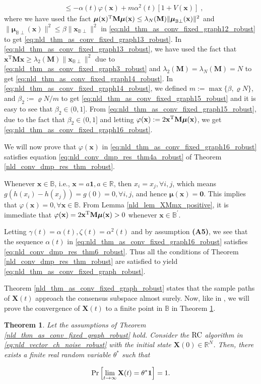 \documentclass[onecolumn, draft, 12pt]{IEEEtran}
\newcommand{\vrho}{\ensuremath{\varrho}}
\newcommand{\Cs}{\mathbb{B}}
\newcommand{\Cprime}{\Cs^{'}}
\newcommand{\R}{\mathbb{R}}
\newcommand{\Rn}{\mathbb{R}^{N}}
\newcommand{\rnld}{\rm RC}
\newcommand{\onevect}{\mathbf{1}}
\newcommand{\Pm}{\mathbf{M}}
\newcommand{\Xcp}{\mathbf{x}_{\Cs \perp}}
\newcommand{\mXcp}{\mathbf{\boldsymbol\mu}_{\Cs \perp}(\mathbf{x})}
\newcommand{\XPX}{{\mathbf{x}}^{\mathrm{T}} \mathbf{M} \mathbf{x}}
\newcommand{\X}{\mathbf{X}}
\newcommand{\xX}{\mathbf{x}}
\newcommand{\cval}{\ensuremath{\theta^{*}}}
\newcommand{\mx}{\mathbf{\boldsymbol\mu}(\mathbf{x})}
\newcommand{\vX}{ V(\mathbf{x})}
\newcommand{\fitX}{ \varphi(\mathbf{x})}
\newtheorem{thm}{Theorem}
\begin{document}
\begin{IEEEproof}
\begin{align}
		& \leq - \alpha(t) \fitX + m  \alpha^2(t) \left[ 1+ \vX \right] \;,			
\end{align}
where we have used the fact $\mx^{\rm T} \Pm \mx \leq \lambda_N(\Pm) \| \mXcp \|^2$ and $\| \mXcp \|^2 \leq \beta \| \Xcp \|^2 $ in \eqref{eq:nld_thm_as_conv_fixed_graph12_robust} to get \eqref{eq:nld_thm_as_conv_fixed_graph13_robust}. In \eqref{eq:nld_thm_as_conv_fixed_graph13_robust}, we have used the fact that $\XPX \geq \lambda_2(\Pm) \| \Xcp \|^2$ due to  \eqref{eq:nld_thm_as_conv_fixed_graph3_robust} and $\lambda_2(\Pm)=\lambda_N(\Pm)=N$ to get \eqref{eq:nld_thm_as_conv_fixed_graph14_robust}. In \eqref{eq:nld_thm_as_conv_fixed_graph14_robust}, we defined  $m := \max \{  \beta, \vrho N  \}$, and $\beta_2 := \vrho N / m$ to get \eqref{eq:nld_thm_as_conv_fixed_graph15_robust} and it is easy to see that $\beta_2 \in (0, 1]$. From  \eqref{eq:nld_thm_as_conv_fixed_graph15_robust}, due to the fact that $\beta_2 \in (0, 1]$ and letting $\fitX := 2 \xX^{\rm T} \Pm \mx$, we get \eqref{eq:nld_thm_as_conv_fixed_graph16_robust}.

We will now prove that $\fitX$ in \eqref{eq:nld_thm_as_conv_fixed_graph16_robust} satisfies equation \eqref{eq:nld_conv_dmp_res_thm4a_robust} of Theorem \ref{nld_conv_dmp_res_thm_robust}.

Whenever $\xX \in \Cs$, i.e., $\xX = a \onevect, a \in \R$, then $x_i=x_j, \forall i,j$, which means $g(h(x_i)-h(x_j))=g(0)=0, \forall i,j$, and hence $\mx = \mathbf{0}$. This implies that $\fitX=0, \forall \xX \in \Cs$. From Lemma \ref{nld_lem_XMmx_positive}, it is immediate that $\fitX = 2 \xX^{\rm T} \Pm \mx > 0$ whenever $\xX \in \Cprime$. 

Letting $\gamma(t)=\alpha(t), \zeta(t)=\alpha^2(t)$ and by assumption \textbf{(A5)}, we see that the sequence $\alpha(t)$ in \eqref{eq:nld_thm_as_conv_fixed_graph16_robust} satisfies \eqref{eq:nld_conv_dmp_res_thm6_robust}. Thus all the conditions of Theorem \ref{nld_conv_dmp_res_thm_robust} are satisfied to yield \eqref{eq:nld_thm_as_conv_fixed_graph_robust}.
\end{IEEEproof}

Theorem \ref{nld_thm_as_conv_fixed_graph_robust} states that the sample paths of $\X(t)$ approach the consensus subspace almost surely. Now, like in \cite{KarMoura2009}, we will prove the convergence of $\X(t)$ to a finite point in $\Cs$ in Theorem \ref{nld_conv_as_limiting_rv_robust}. 

\begin{thm} \label{nld_conv_as_limiting_rv_robust}
Let the assumptions of Theorem \ref{nld_thm_as_conv_fixed_graph_robust} hold. Consider the $\rnld$ algorithm in \eqref{eq:nld_vector_ch_noise_robust} with the initial state $\X(0) \in \Rn$. Then, there exists a finite real random variable $\cval$ such that

\begin{equation} \label{eq:nld_conv_as_limiting_rv_robust}
{\rm Pr}\left[ \lim_{t \rightarrow \infty} \X(t) = \cval \onevect \right]=1.
\end{equation}

\end{thm}
\end{document}

